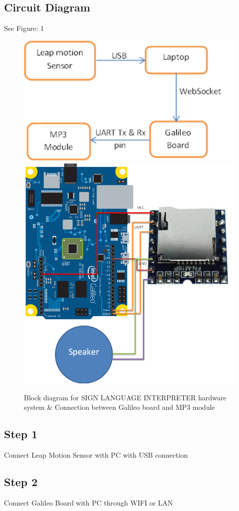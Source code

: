 \documentclass[a4paper,12pt,oneside]{book}
\begin{document}
\subsection*{Circuit Diagram}
See Figure: 1
\begin{figure}
  \includegraphics[width=12cm]{1.png}
  \includegraphics[width=12cm]{5.png}
 \caption{Block diagram for SIGN LANGUAGE INTERPRETER hardware system \& Connection between Galileo board and MP3 module}
\end{figure}
\subsection*{Step 1}
Connect Leap Motion Sensor with PC with USB connection
\subsection*{Step 2}
Connect Galileo Board with PC through WIFI or LAN
\end{document}
